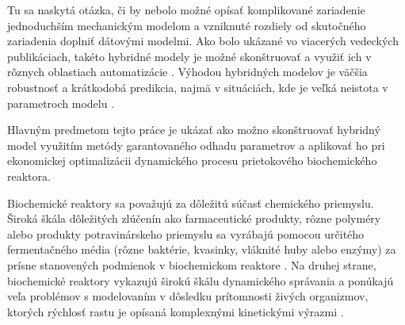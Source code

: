 Tu sa naskytá otázka, či by nebolo možné opísať komplikované zariadenie jednoduchším mechanickým modelom a vzniknuté rozdiely od skutočného zariadenia doplniť dátovými modelmi. Ako bolo ukázané vo viacerých vedeckých publikáciach, takéto hybridné modely je možné skonštruovať a využiť ich v rôznych oblastiach automatizácie \cite{hamilton:hybrid_modeling:2017, hernandez:economics_opt_w_mismatch:2019}.
Výhodou hybridných modelov je väčšia robustnosť a krátkodobá predikcia, najmä v situáciách, kde je veľká neistota v parametroch modelu \cite{hamilton:hybrid_modeling:2017}.

Hlavným predmetom tejto práce je ukázať ako možno skonštruovať hybridný model využitím metódy garantovaného odhadu parametrov a aplikovať ho pri ekonomickej optimalizácii dynamického procesu prietokového biochemického reaktora.

Biochemické reaktory sa považujú za dôležitú súčasť chemického priemyslu. Široká škála dôležitých zlúčenín ako farmaceutické produkty, rôzne polyméry alebo produkty potravinárskeho priemyslu sa vyrábajú pomocou určitého fermentačného média (rôzne baktérie, kvasinky, vláknité huby alebo enzýmy) za prísne stanovených podmienok v biochemickom reaktore \cite{srinivasan:chemostat_opt:2003}. Na druhej strane, biochemické reaktory vykazujú širokú škálu dynamického správania a ponúkajú veľa problémov s modelovaním v dôsledku prítomnosti živých organizmov, ktorých rýchlosť rastu je opísaná komplexnými kinetickými výrazmi \cite{psichogios:hybrid_process_model:1992}.

